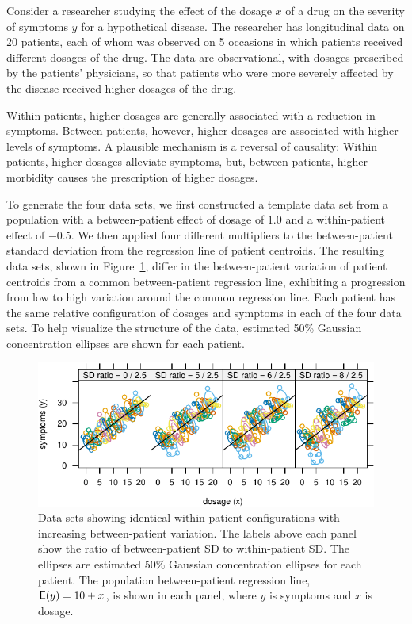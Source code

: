 \documentclass[
]{jss}
\begin{document}
Consider a researcher studying the effect of the dosage \(x\) of a drug
on the severity of symptoms \(y\) for a hypothetical disease. The
researcher has longitudinal data on 20 patients, each of whom was
observed on 5 occasions in which patients received different dosages of
the drug. The data are observational, with dosages prescribed by the
patients' physicians, so that patients who were more severely affected
by the disease received higher dosages of the drug.

Within patients, higher dosages are generally associated with a
reduction in symptoms. Between patients, however, higher dosages are
associated with higher levels of symptoms. A plausible mechanism is a
reversal of causality: Within patients, higher dosages alleviate
symptoms, but, between patients, higher morbidity causes the
prescription of higher dosages.

To generate the four data sets, we first constructed a template data set
from a population with a between-patient effect of dosage of \(1.0\) and
a within-patient effect of \(-0.5\). We then applied four different
multipliers to the between-patient standard deviation from the
regression line of patient centroids. The resulting data sets, shown in
Figure~\ref{fig:plot1}, differ in the between-patient variation of
patient centroids from a common between-patient regression line,
exhibiting a progression from low to high variation around the common
regression line. Each patient has the same relative configuration of
dosages and symptoms in each of the four data sets. To help visualize
the structure of the data, estimated 50\% Gaussian concentration
ellipses are shown for each patient.

\begin{CodeChunk}
\begin{figure}

{\centering \includegraphics[width=0.75\linewidth]{Figures/plot1-1}

}

\caption[Data sets showing identical within-patient configurations with increasing between-patient variation]{Data sets showing identical within-patient configurations with increasing between-patient variation. The labels above each panel show the ratio of between-patient SD to within-patient SD. The ellipses are estimated 50\% Gaussian concentration ellipses for each patient. The population between-patient regression line, $\mathsf{E}(y) = 10 + x$, is shown in each panel, where $y$ is symptoms and $x$ is dosage.}\label{fig:plot1}
\end{figure}
\end{CodeChunk}
\end{document}
